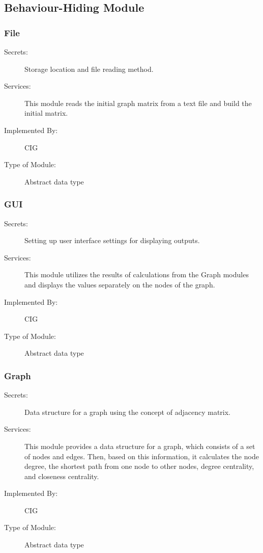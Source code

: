 \documentclass[12pt, titlepage]{article}
\begin{document}
\subsection{Behaviour-Hiding Module}



\subsubsection{File }

\begin{description}
\item[Secrets:] Storage location and file reading method.
\item[Services:] This module reads the initial graph matrix from a text file and build the initial matrix.
\item[Implemented By:] CIG
\item[Type of Module:] Abstract data type
\end{description}

\subsubsection{GUI }
\begin{description}
\item[Secrets:] Setting up user interface settings for displaying outputs.
\item[Services:] This module utilizes the results of calculations from the  Graph modules and displays the values separately on the nodes of the graph.
\item[Implemented By:] CIG
\item[Type of Module:] Abstract data type
\end{description}

\subsubsection{Graph }
\begin{description}
\item[Secrets:] Data structure for a graph using the concept of adjacency matrix.
\item[Services:] This module provides a data structure for a graph, which consists of a set of nodes and edges. Then, based on this information, it calculates the node degree, the shortest path from one node to other nodes, degree centrality, and closeness centrality.
\item[Implemented By:] CIG
\item[Type of Module:] Abstract data type
\end{description}
\end{document}
